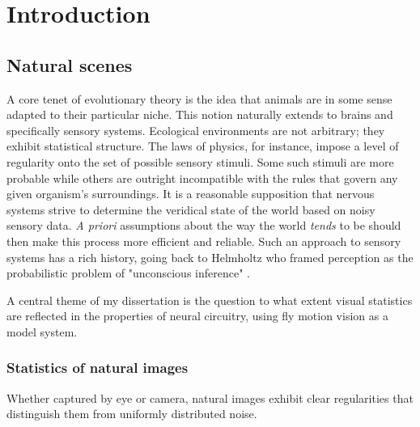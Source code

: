 \chapter{Introduction}
\label{chp:introduction}



\section{Natural scenes}

A core tenet of evolutionary theory is the idea that animals are in some sense adapted to their particular niche. This notion naturally extends to brains and specifically sensory systems. Ecological environments are not arbitrary; they exhibit statistical structure. The laws of physics, for instance, impose a level of regularity onto the set of possible sensory stimuli. Some such stimuli are more probable while others are outright incompatible with the rules that govern any given organism's surroundings. It is a reasonable supposition that nervous systems strive to determine the veridical state of the world based on noisy sensory data. \textit{A priori} assumptions about the way the world \textit{tends} to be should then make this process more efficient and reliable. Such an approach to sensory systems has a rich history, going back to Helmholtz who framed perception as the probabilistic problem of "unconscious inference" \citep{Helmholtz:1867aa}.

A central theme of my dissertation is the question to what extent visual statistics are reflected in the properties of neural circuitry, using fly motion vision as a model system.

\subsection{Statistics of natural images} Whether captured by eye or camera, natural images exhibit clear regularities that distinguish them from uniformly distributed noise.

